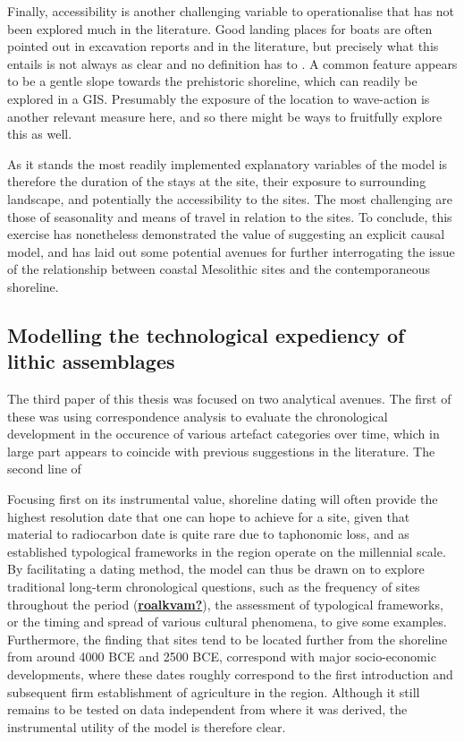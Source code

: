 \documentclass[
  a4paper,
  oneside]{uiophdthesis}
\begin{document}
Finally, accessibility is another challenging variable to operationalise that has not been explored much in the literature. Good landing places for boats are often pointed out in excavation reports and in the literature, but precisely what this entails is not always as clear and no definition has to . A common feature appears to be a gentle slope towards the prehistoric shoreline, which can readily be explored in a GIS. Presumably the exposure of the location to wave-action is another relevant measure here, and so there might be ways to fruitfully explore this as well.

As it stands the most readily implemented explanatory variables of the model is therefore the duration of the stays at the site, their exposure to surrounding landscape, and potentially the accessibility to the sites. The most challenging are those of seasonality and means of travel in relation to the sites. To conclude, this exercise has nonetheless demonstrated the value of suggesting an explicit causal model, and has laid out some potential avenues for further interrogating the issue of the relationship between coastal Mesolithic sites and the contemporaneous shoreline.

\hypertarget{modelling-the-technological-expediency-of-lithic-assemblages}{%
\subsection{Modelling the technological expediency of lithic assemblages}\label{modelling-the-technological-expediency-of-lithic-assemblages}}

The third paper of this thesis was focused on two analytical avenues. The first of these was using correspondence analysis to evaluate the chronological development in the occurence of various artefact categories over time, which in large part appears to coincide with previous suggestions in the literature. The second line of

Focusing first on its instrumental value, shoreline dating will often provide the highest resolution date that one can hope to achieve for a site, given that material to radiocarbon date is quite rare due to taphonomic loss, and as established typological frameworks in the region operate on the millennial scale. By facilitating a dating method, the model can thus be drawn on to explore traditional long-term chronological questions, such as the frequency of sites throughout the period (\protect\hyperlink{ref-roalkvam}{\textbf{roalkvam?}}), the assessment of typological frameworks, or the timing and spread of various cultural phenomena, to give some examples. Furthermore, the finding that sites tend to be located further from the shoreline from around 4000 BCE and 2500 BCE, correspond with major socio-economic developments, where these dates roughly correspond to the first introduction and subsequent firm establishment of agriculture in the region. Although it still remains to be tested on data independent from where it was derived, the instrumental utility of the model is therefore clear.
\end{document}
